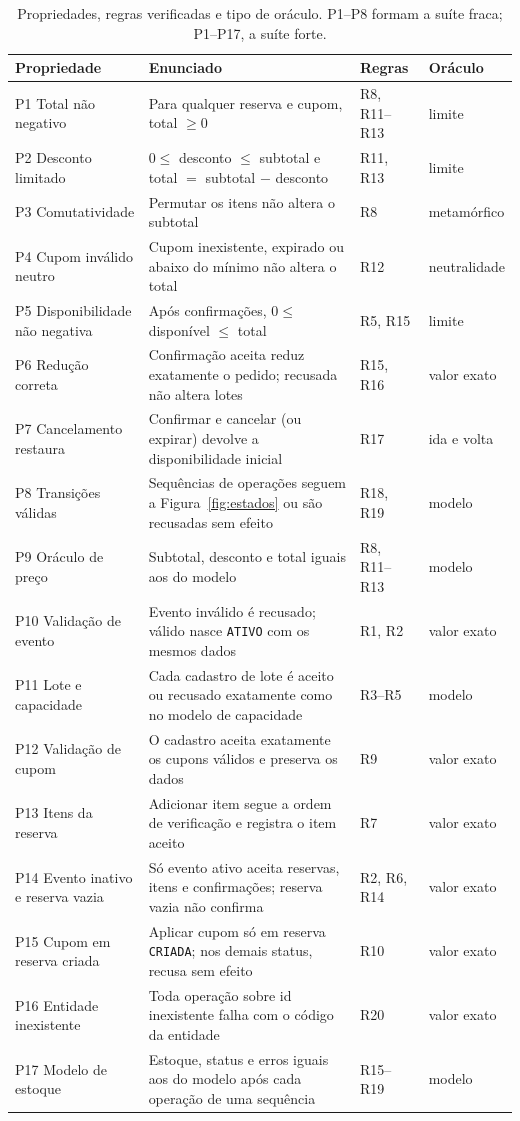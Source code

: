 \begin{table}[H]
\centering
\caption{Propriedades, regras verificadas e tipo de oráculo. P1--P8 formam a suíte fraca; P1--P17, a suíte forte.}
\label{tab:propriedades}
\small
\begin{tabularx}{\textwidth}{@{}L{3.4cm} Y l l@{}}
\toprule
Propriedade & Enunciado & Regras & Oráculo \\
\midrule
P1 Total não negativo & Para qualquer reserva e cupom, total $\ge 0$ & R8, R11--R13 & limite \\
P2 Desconto limitado & $0 \le$ desconto $\le$ subtotal e total $=$ subtotal $-$ desconto & R11, R13 & limite \\
P3 Comutatividade & Permutar os itens não altera o subtotal & R8 & metamórfico \\
P4 Cupom inválido neutro & Cupom inexistente, expirado ou abaixo do mínimo não altera o total & R12 & neutralidade \\
P5 Disponibilidade não negativa & Após confirmações, $0 \le$ disponível $\le$ total & R5, R15 & limite \\
P6 Redução correta & Confirmação aceita reduz exatamente o pedido; recusada não altera lotes & R15, R16 & valor exato \\
P7 Cancelamento restaura & Confirmar e cancelar (ou expirar) devolve a disponibilidade inicial & R17 & ida e volta \\
P8 Transições válidas & Sequências de operações seguem a Figura~\ref{fig:estados} ou são recusadas sem efeito & R18, R19 & modelo \\
\midrule
P9 Oráculo de preço & Subtotal, desconto e total iguais aos do modelo & R8, R11--R13 & modelo \\
P10 Validação de evento & Evento inválido é recusado; válido nasce \texttt{ATIVO} com os mesmos dados & R1, R2 & valor exato \\
P11 Lote e capacidade & Cada cadastro de lote é aceito ou recusado exatamente como no modelo de capacidade & R3--R5 & modelo \\
P12 Validação de cupom & O cadastro aceita exatamente os cupons válidos e preserva os dados & R9 & valor exato \\
P13 Itens da reserva & Adicionar item segue a ordem de verificação e registra o item aceito & R7 & valor exato \\
P14 Evento inativo e reserva vazia & Só evento ativo aceita reservas, itens e confirmações; reserva vazia não confirma & R2, R6, R14 & valor exato \\
P15 Cupom em reserva criada & Aplicar cupom só em reserva \texttt{CRIADA}; nos demais status, recusa sem efeito & R10 & valor exato \\
P16 Entidade inexistente & Toda operação sobre id inexistente falha com o código da entidade & R20 & valor exato \\
P17 Modelo de estoque & Estoque, status e erros iguais aos do modelo após cada operação de uma sequência & R15--R19 & modelo \\
\bottomrule
\end{tabularx}
\end{table}

